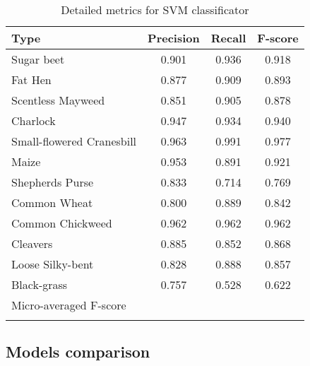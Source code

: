 \begin{table}[h!]
    \caption{Detailed metrics for SVM classificator}
    \begin{center}
        \begin{tabular}{lccc}
            \toprule
            \textbf{Type} & \textbf{Precision} & \textbf{Recall} & \textbf{F-score} \\
            \midrule
            Sugar beet       & 0.901 & 0.936 & 0.918 \\
            Fat Hen          & 0.877 & 0.909 & 0.893 \\
            Scentless Mayweed & 0.851 & 0.905 & 0.878 \\
            Charlock         & 0.947 & 0.934 & 0.940  \\
            Small-flowered Cranesbill & 0.963 & 0.991 & 0.977 \\
            Maize            & 0.953 & 0.891 & 0.921   \\
            Shepherds Purse  & 0.833 & 0.714 & 0.769 \\
            Common Wheat     & 0.800 & 0.889 & 0.842 \\
            Common Chickweed & 0.962 & 0.962 & 0.962 \\
            Cleavers         & 0.885 & 0.852 & 0.868 \\
            Loose Silky-bent & 0.828 & 0.888 & 0.857  \\
            Black-grass      & 0.757 & 0.528 & 0.622 \\
            \midrule
            \multicolumn{3}{l}{Micro-averaged F-score} 0.885 \\
            \bottomrule
            \label{table:metrics}
        \end{tabular}
    \end{center}
\end{table}

\subsection{Models comparison}


